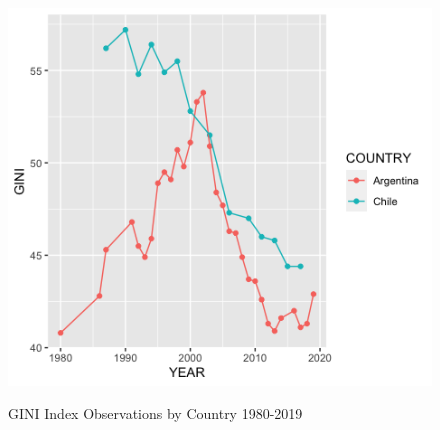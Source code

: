 \documentclass[12pt,english]{article}
\begin{document}
\begin{figure}[ht]
\centering
\bigskip{}
\includegraphics{GINI Plot.png}
\caption{GINI Index Observations by Country 1980-2019}\citet{WB:2021}
\label{fig:fig2}
\end{figure}


\end{document}

